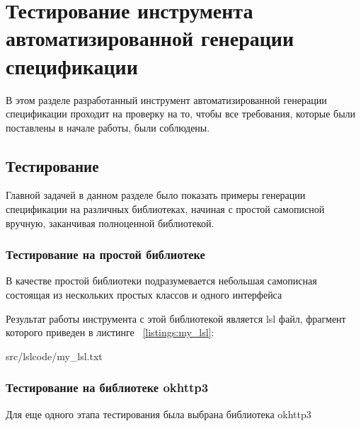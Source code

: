 \chapter{Тестирование инструмента автоматизированной генерации спецификации}

В этом разделе разработанный инструмент автоматизированной генерации спецификации проходит на проверку на то, чтобы все требования, которые были поставлены в начале работы, были соблюдены.

\section{Тестирование}

Главной задачей в данном разделе было показать примеры генерации спецификации на различных библиотеках, начиная с простой самописной вручную, заканчивая полноценной библиотекой.

\subsection{Тестирование на простой библиотеке}

В качестве простой библиотеки подразумевается небольшая самописная состоящая из нескольких простых классов и одного интерфейса

Результат работы инструмента с этой библиотекой является lsl файл, фрагмент которого приведен в листинге ~\ref{listings:my_lsl}:

{src/lslcode/my_lsl.txt}

\subsection{Тестирование на библиотеке okhttp3}

Для еще одного этапа тестирования была выбрана библиотека okhttp3

